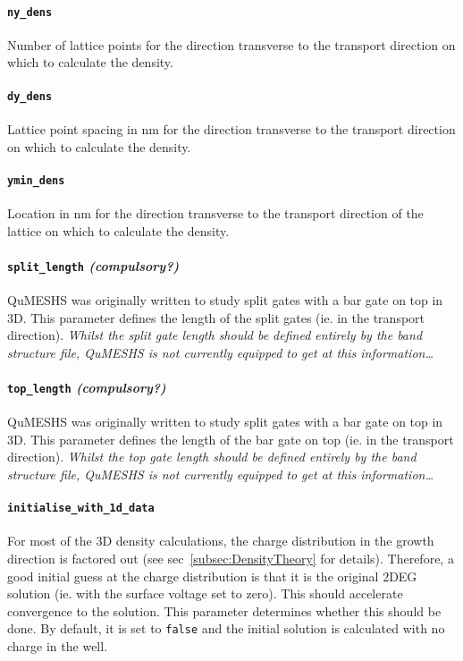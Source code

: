 \documentclass[12pt]{article}
\newcommand{\red}[1]{{\color{red} \it #1}}
\begin{document}
\paragraph{\texttt{ny\_dens}}
Number of lattice points for the direction transverse to the transport direction on which
to calculate the density.

\paragraph{\texttt{dy\_dens}}
Lattice point spacing in nm for the direction transverse to the transport direction on
which to calculate the density.

\paragraph{\texttt{ymin\_dens}}
Location in nm for the direction transverse to the transport direction of the lattice on
which to calculate the density.

\paragraph{\texttt{split\_length} \emph{(compulsory?)}}
QuMESHS was originally written to study split gates with a bar gate on top in 3D.  This
parameter defines the length of the split gates (ie. in the transport direction).
\red{Whilst the split gate length should be defined entirely by the band structure file,
QuMESHS is not currently equipped to get at this information\ldots}

\paragraph{\texttt{top\_length} \emph{(compulsory?)}}
QuMESHS was originally written to study split gates with a bar gate on top in 3D.  This
parameter defines the length of the bar gate on top (ie. in the transport direction).
\red{Whilst the top gate length should be defined entirely by the band structure file,
QuMESHS is not currently equipped to get at this information\ldots}

\paragraph{\texttt{initialise\_with\_1d\_data}}
For most of the 3D density calculations, the charge distribution in the growth direction
is factored out (see sec~\ref{subsec:DensityTheory} for details).  Therefore, a good
initial guess at the charge distribution is that it is the original 2DEG solution (ie.
with the surface voltage set to zero).  This should accelerate convergence to the solution.
This parameter determines whether this should be done.  By default, it is set to
\texttt{false} and the initial solution is calculated with no charge in the well.
\end{document}
